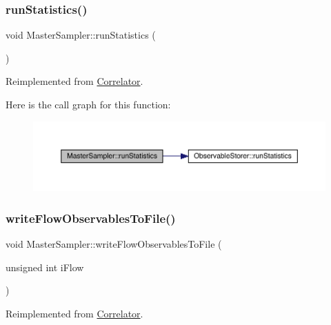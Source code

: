\subsubsection{\texorpdfstring{runStatistics()}{runStatistics()}}
{\footnotesize\ttfamily void Master\+Sampler\+::run\+Statistics (\begin{DoxyParamCaption}{ }\end{DoxyParamCaption})\hspace{0.3cm}{\ttfamily [virtual]}}



Reimplemented from \mbox{\hyperlink{class_correlator_a35197b1d12b62ef30b79c0138a26456e}{Correlator}}.

Here is the call graph for this function\+:\nopagebreak
\begin{figure}[H]
\begin{center}
\leavevmode
\includegraphics[width=350pt]{class_master_sampler_ab7913d0dbdea57af3f469a3cdd74f8fc_cgraph}
\end{center}
\end{figure}
\mbox{\label{class_master_sampler_ad475928217ac61fae134128904aaa9f8}} 
\subsubsection{\texorpdfstring{writeFlowObservablesToFile()}{writeFlowObservablesToFile()}}
{\footnotesize\ttfamily void Master\+Sampler\+::write\+Flow\+Observables\+To\+File (\begin{DoxyParamCaption}\item[{unsigned int}]{i\+Flow }\end{DoxyParamCaption})\hspace{0.3cm}{\ttfamily [virtual]}}



Reimplemented from \mbox{\hyperlink{class_correlator_a168512b2ce182d9478db47f100125fa6}{Correlator}}.

